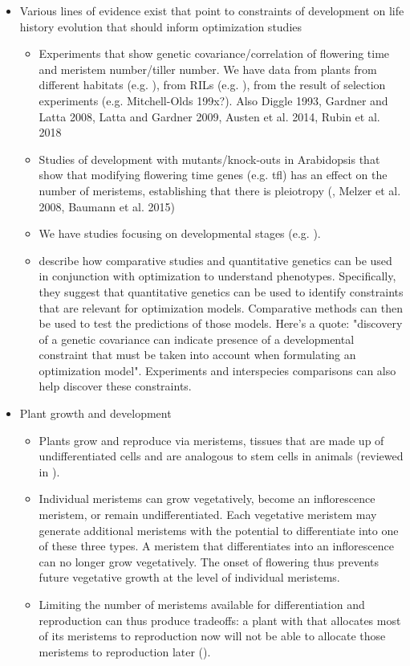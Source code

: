 \documentclass[12pt, oneside,titlepage]{article}   	%
\begin{document}
\begin{itemize}
\item Various lines of evidence exist that point to constraints of development on life history evolution that should inform optimization studies 

\begin{itemize}
\item Experiments that show genetic covariance/correlation of flowering time and meristem number/tiller number. We have data from plants from different habitats (e.g. \cite{geber1990a,schmitt1993}), from RILs (e.g. \cite{haselhorst2011}), from the result of selection experiments (e.g. Mitchell-Olds 199x?). Also \cite{watson1984a,vantienderen1996,duffy1999,kudoh2002,friedman2015a} Diggle 1993, Gardner and Latta 2008, Latta and Gardner 2009, Austen et al.  2014, Rubin et al. 2018
\item Studies of development with mutants/knock-outs in Arabidopsis that show that modifying flowering time genes (e.g. tfl) has an effect on the number of meristems, establishing that there is pleiotropy (\cite{bradley1997,karami2020}, Melzer et al. 2008, Baumann et al. 2015)
\item We have studies focusing on developmental stages (e.g. \cite{baker2011}). 
\item \cite{parker1990} describe how comparative studies and quantitative genetics can be used in conjunction with optimization to understand phenotypes. Specifically, they suggest that quantitative genetics can be used to identify constraints that are relevant for optimization models. Comparative methods can then  be used to test the predictions of those models. Here's a quote: "discovery of a genetic covariance can indicate presence of a developmental constraint that must be taken into account when formulating an optimization model". Experiments and interspecies comparisons can also help discover these constraints. 
\end{itemize}  

\item Plant growth and development

\begin{itemize}
\item Plants grow and reproduce via meristems, tissues that are made up of undifferentiated cells and are analogous to stem cells in animals (reviewed in \cite{mcsteen2005,wang2018}).
\item Individual meristems can grow vegetatively, become an inflorescence meristem, or remain undifferentiated. Each vegetative meristem may generate additional meristems with the potential to differentiate into one of these three types. A meristem that differentiates into an inflorescence can no longer grow vegetatively. The onset of flowering thus prevents future vegetative growth at the level of individual meristems.
\item Limiting the number of meristems available for differentiation and reproduction can thus produce tradeoffs: a plant with that allocates most of its meristems to reproduction now will not be able to allocate those meristems to reproduction later (\cite{watson1984a,geber1990a,schmitt1993}).
\end{itemize}


\end{itemize}
\end{document}

